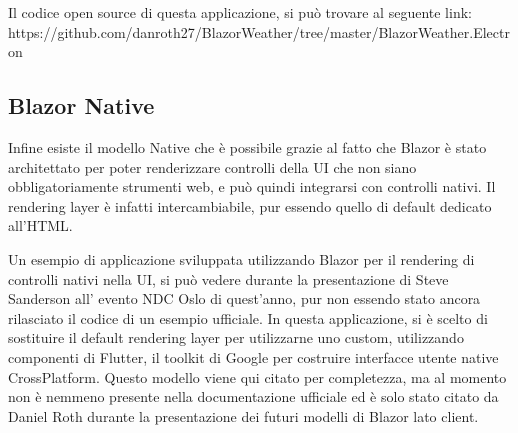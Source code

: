 Il codice open source di questa applicazione, si pu\`o trovare al seguente link: https://github.com/danroth27/BlazorWeather/tree/master/BlazorWeather.Electron
\pagebreak

\subsection{Blazor Native}\label{sez:bnative}
Infine esiste il modello Native che \`e possibile grazie al fatto che Blazor \`e stato architettato per poter renderizzare controlli della UI che non siano obbligatoriamente strumenti web, e pu\`o quindi integrarsi con controlli nativi.
Il rendering layer \`e infatti intercambiabile, pur essendo quello di default dedicato all'HTML.

Un esempio di applicazione sviluppata utilizzando Blazor per il rendering di controlli nativi nella UI, si pu\`o vedere durante la presentazione di Steve Sanderson all' evento NDC Oslo di quest'anno, pur non essendo stato ancora rilasciato il codice di un esempio ufficiale.\cite{sandersonNDCBlutter}
In questa applicazione, si \`e scelto di sostituire il default rendering layer per utilizzarne uno custom, utilizzando componenti di Flutter, il toolkit di Google per costruire interfacce utente native CrossPlatform.
Questo modello viene qui citato per completezza, ma al momento non \`e nemmeno presente nella documentazione ufficiale ed \`e solo stato citato da Daniel Roth durante la presentazione dei futuri modelli di Blazor lato client.\cite{blazorNative}

